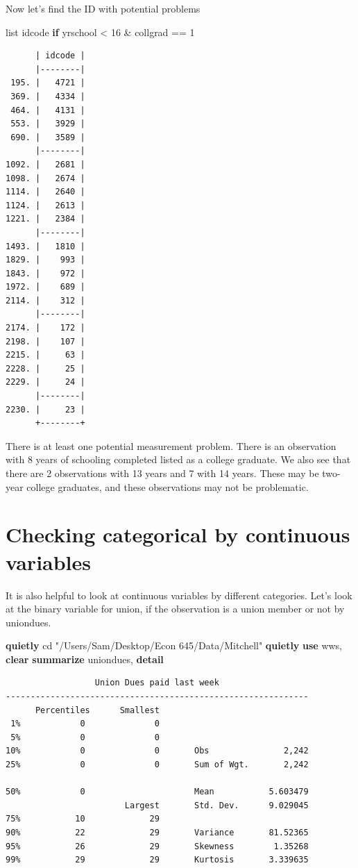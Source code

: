\documentclass[
]{book}
\newenvironment{Shaded}{\begin{snugshade}}{\end{snugshade}}
\newcommand{\KeywordTok}[1]{\textcolor[rgb]{0.13,0.29,0.53}{\textbf{#1}}}
\newcommand{\NormalTok}[1]{#1}
\newcommand{\OtherTok}[1]{\textcolor[rgb]{0.56,0.35,0.01}{#1}}
\newcommand{\StringTok}[1]{\textcolor[rgb]{0.31,0.60,0.02}{#1}}
\begin{document}
Now let's find the ID with potential problems

\begin{Shaded}
\begin{Highlighting}[]
\OtherTok{list}\NormalTok{ idcode }\KeywordTok{if}\NormalTok{ yrschool \textless{} 16 \& collgrad == 1}
\end{Highlighting}
\end{Shaded}

\begin{verbatim}
      | idcode |
      |--------|
 195. |   4721 |
 369. |   4334 |
 464. |   4131 |
 553. |   3929 |
 690. |   3589 |
      |--------|
1092. |   2681 |
1098. |   2674 |
1114. |   2640 |
1124. |   2613 |
1221. |   2384 |
      |--------|
1493. |   1810 |
1829. |    993 |
1843. |    972 |
1972. |    689 |
2114. |    312 |
      |--------|
2174. |    172 |
2198. |    107 |
2215. |     63 |
2228. |     25 |
2229. |     24 |
      |--------|
2230. |     23 |
      +--------+
\end{verbatim}

There is at least one potential measurement problem. There is an observation with 8 years of schooling completed listed as a college graduate. We also see that there are 2 observations with 13 years and 7 with 14 years. These may be two-year college graduates, and these observations may not be problematic.

\section{Checking categorical by continuous variables}\label{checking-categorical-by-continuous-variables}

It is also helpful to look at continuous variables by different categories. Let's look at the binary variable for union, if the observation is a union member or not by uniondues.

\begin{Shaded}
\begin{Highlighting}[]
\KeywordTok{quietly}\NormalTok{ cd }\StringTok{"/Users/Sam/Desktop/Econ 645/Data/Mitchell"}
\KeywordTok{quietly} \KeywordTok{use}\NormalTok{ wws, }\KeywordTok{clear}
\KeywordTok{summarize}\NormalTok{ uniondues, }\KeywordTok{detail}
\end{Highlighting}
\end{Shaded}

\begin{verbatim}
                  Union Dues paid last week
-------------------------------------------------------------
      Percentiles      Smallest
 1%            0              0
 5%            0              0
10%            0              0       Obs               2,242
25%            0              0       Sum of Wgt.       2,242

50%            0                      Mean           5.603479
                        Largest       Std. Dev.      9.029045
75%           10             29
90%           22             29       Variance       81.52365
95%           26             29       Skewness        1.35268
99%           29             29       Kurtosis       3.339635
\end{verbatim}
\end{document}
